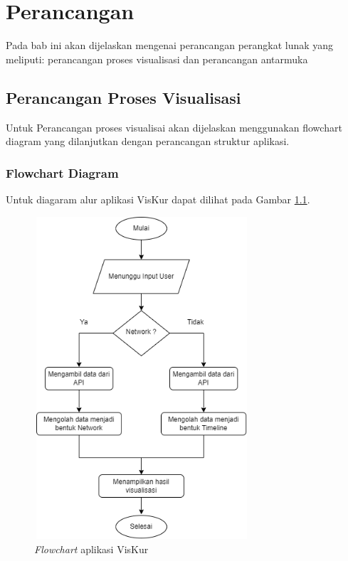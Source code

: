 \chapter{Perancangan}
\label{chap:perancangan}

Pada bab ini akan dijelaskan mengenai perancangan perangkat lunak yang meliputi: perancangan proses visualisasi dan perancangan antarmuka

\section{Perancangan Proses Visualisasi}
Untuk Perancangan proses visualisai akan dijelaskan menggunakan flowchart diagram yang dilanjutkan dengan perancangan struktur aplikasi. 

\subsection{Flowchart Diagram}
Untuk diagaram alur aplikasi VisKur dapat dilihat pada Gambar \ref{fig:gambarFlowchart}.

\begin{figure}[H]
    \centering
    \includegraphics[width=8cm, height=12cm]{Gambar/flowchart.png}
    \caption{\textit{Flowchart} aplikasi VisKur}
    \label{fig:gambarFlowchart}
\end{figure}

